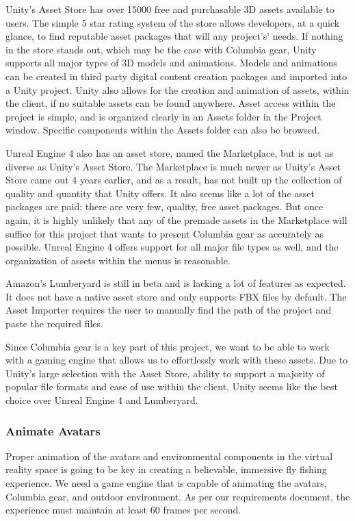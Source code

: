 \documentclass[10pt,journal,compsoc,onecolumn, draftclsnofoot]{IEEEtran}
\begin{document}
\begin{bibunit}
Unity's Asset Store has over 15000 free and purchasable 3D assets available to users. The simple 5 star rating system of the store allows developers, at a quick glance, to find reputable asset packages that will any project's' needs. If nothing in the store stands out, which may be the case with Columbia gear, Unity supports all major types of 3D models and animations. Models and animations can be created in third party digital content creation packages and imported into a Unity project. Unity also allows for the creation and animation of assets, within the client, if no suitable assets can be found anywhere. Asset access within the project is simple, and is organized clearly in an Assets folder in the Project window. Specific components within the Assets folder can also be browsed.

Unreal Engine 4 also has an asset store, named the Marketplace, but is not as diverse as Unity's Asset Store. The Marketplace is much newer\cite{unreal_marketplace_date} as Unity's Asset Store came out 4 years earlier, and as a result, has not built up the collection of quality and quantity that Unity offers. It also seems like a lot of the asset packages are paid; there are very few, quality, free asset packages. But once again, it is highly unlikely that any of the premade assets in the Marketplace will suffice for this project that wants to present Columbia gear as accurately as possible. Unreal Engine 4 offers support for all major file types as well, and the organization of assets within the menus is reasonable.

Amazon's Lumberyard is still in beta and is lacking a lot of features as expected. It does not have a native asset store and only supports FBX files by default. The Asset Importer requires the user to manually find the path of the project and paste the required files\cite{lumberyard_import}.

Since Columbia gear is a key part of this project, we want to be able to work with a gaming engine that allows us to effortlessly work with these assets. Due to Unity's large selection with the Asset Store, ability to support a majority of popular file formats and ease of use within the client, Unity seems like the best choice over Unreal Engine 4 and Lumberyard.

\subsubsection{Animate Avatars}
Proper animation of the avatars and environmental components in the virtual reality space is going to be key in creating a believable, immersive fly fishing experience. We need a game engine that is capable of animating the avatars, Columbia gear, and outdoor environment. As per our requirements document, the experience must maintain at least 60 frames per second.


\end{bibunit}
\end{document}
